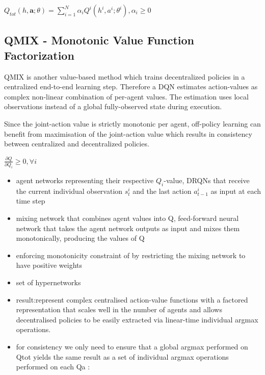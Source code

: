 \begin{center}
$Q_{t o t}(h, \mathbf{a} ; \theta)=\sum_{i=1}^{N} \alpha_{i} Q^{i}\left(h^{i}, a^{i} ; \theta^{i}\right), \alpha_{i} \geq 0$
\end{center} \cite{wen2020smix}


\subsection{QMIX - Monotonic Value Function Factorization}

QMIX is another value-based method which trains decentralized policies in a centralized end-to-end learning step. Therefore a DQN estimates action-values as complex non-linear combination of per-agent values. The estimation uses local observations instead of a global fully-observed state during execution. 

Since the joint-action value is strictly monotonic per agent, off-policy learning can benefit from maximisation of the joint-action value which results in consistency between centralized and decentralized policies. \cite{rashid2018qmix}

\begin{center}
$\frac{\partial Q}{\partial Q_{i}} \geq 0, \forall i$
\end{center}

\begin{itemize}
	\item agent networks representing their respective $Q_{i}$-value, DRQNs that receive the current individual observation $s^{i}_{t}$ and the last action $a^{i}_{t-1}$ as input at each time step
	
	\item mixing network that combines agent values into Q, feed-forward neural network that	takes the agent network outputs as input and mixes them monotonically, producing the values of Q

	\item enforcing monotonicity constraint of by restricting the mixing network to have	positive weights
	
	\item set of hypernetworks
	
	\item result:represent complex centralised action-value functions with a factored representation that scales well in the number of agents and allows
	decentralised policies to be easily extracted via linear-time
	individual argmax operations.
	
	\item for consistency we only need
	to ensure that a global argmax performed on Qtot yields
	the same result as a set of individual argmax operations
	performed on each Qa :
	
\end{itemize}


